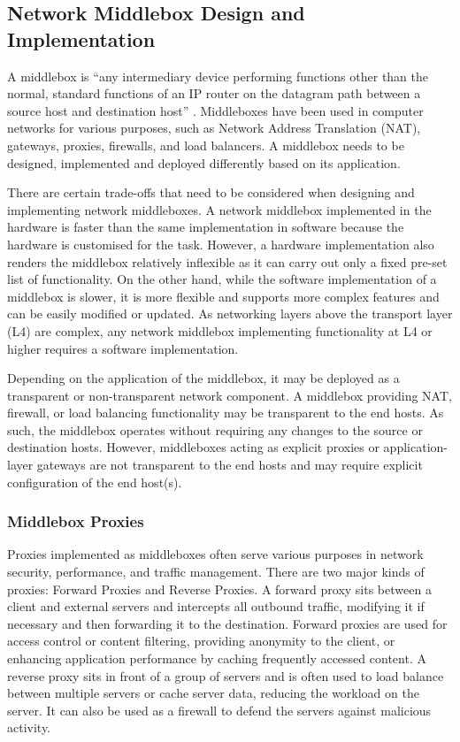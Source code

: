 \subsection{Network Middlebox Design and Implementation}
\label{subsec:netshaper-background-network-middlebox-designs}

A middlebox is ``any intermediary device performing functions other than the normal, standard functions of an IP router on the datagram path between a source host and destination host'' \cite{rfc3234middleboxes}.
Middleboxes have been used in computer networks for various purposes, such as Network Address Translation (NAT), gateways, proxies, firewalls, and load balancers.
A middlebox needs to be designed, implemented and deployed differently based on its application.

There are certain trade-offs that need to be considered when designing and implementing network middleboxes.
A network middlebox implemented in the hardware is faster than the same implementation in software because the hardware is customised for the task.
However, a hardware implementation also renders the middlebox relatively inflexible as it can carry out only a fixed pre-set list of functionality.
On the other hand, while the software implementation of a middlebox is slower, it is more flexible and supports more complex features and can be easily modified or updated.
As networking layers above the transport layer (L4) are complex, any network middlebox implementing functionality at L4 or higher requires a software implementation.

Depending on the application of the middlebox, it may be deployed as a transparent or non-transparent network component.
A middlebox providing NAT, firewall, or load balancing functionality may be transparent to the end hosts.
As such, the middlebox operates without requiring any changes to the source or destination hosts.
However, middleboxes acting as explicit proxies or application-layer gateways are not transparent to the end hosts and may require explicit configuration of the end host(s).

\subsubsection{Middlebox Proxies}
\label{netshaper-background-middlebox-proxies}

Proxies implemented as middleboxes often serve various purposes in network security, performance, and traffic management.
There are two major kinds of proxies: Forward Proxies and Reverse Proxies.
A forward proxy sits between a client and external servers and intercepts all outbound traffic, modifying it if necessary and then forwarding it to the destination.
Forward proxies are used for access control or content filtering, providing anonymity to the client, or enhancing application performance by caching frequently accessed content.
A reverse proxy sits in front of a group of servers and is often used to load balance between multiple servers or cache server data, reducing the workload on the server. 
It can also be used as a firewall to defend the servers against malicious activity.

